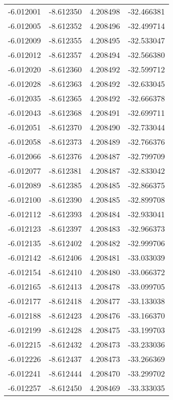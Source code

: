 \begin{tabular}{rrrr}
       -6.012001 &        -8.612350 &    4.208498 & -32.466381 \\
       -6.012005 &        -8.612352 &    4.208496 & -32.499714 \\
       -6.012009 &        -8.612355 &    4.208495 & -32.533047 \\
       -6.012012 &        -8.612357 &    4.208494 & -32.566380 \\
       -6.012020 &        -8.612360 &    4.208492 & -32.599712 \\
       -6.012028 &        -8.612363 &    4.208492 & -32.633045 \\
       -6.012035 &        -8.612365 &    4.208492 & -32.666378 \\
       -6.012043 &        -8.612368 &    4.208491 & -32.699711 \\
       -6.012051 &        -8.612370 &    4.208490 & -32.733044 \\
       -6.012058 &        -8.612373 &    4.208489 & -32.766376 \\
       -6.012066 &        -8.612376 &    4.208487 & -32.799709 \\
       -6.012077 &        -8.612381 &    4.208487 & -32.833042 \\
       -6.012089 &        -8.612385 &    4.208485 & -32.866375 \\
       -6.012100 &        -8.612390 &    4.208485 & -32.899708 \\
       -6.012112 &        -8.612393 &    4.208484 & -32.933041 \\
       -6.012123 &        -8.612397 &    4.208483 & -32.966373 \\
       -6.012135 &        -8.612402 &    4.208482 & -32.999706 \\
       -6.012142 &        -8.612406 &    4.208481 & -33.033039 \\
       -6.012154 &        -8.612410 &    4.208480 & -33.066372 \\
       -6.012165 &        -8.612413 &    4.208478 & -33.099705 \\
       -6.012177 &        -8.612418 &    4.208477 & -33.133038 \\
       -6.012188 &        -8.612423 &    4.208476 & -33.166370 \\
       -6.012199 &        -8.612428 &    4.208475 & -33.199703 \\
       -6.012215 &        -8.612432 &    4.208473 & -33.233036 \\
       -6.012226 &        -8.612437 &    4.208473 & -33.266369 \\
       -6.012241 &        -8.612444 &    4.208470 & -33.299702 \\
       -6.012257 &        -8.612450 &    4.208469 & -33.333035 \\
\bottomrule
\end{tabular}
